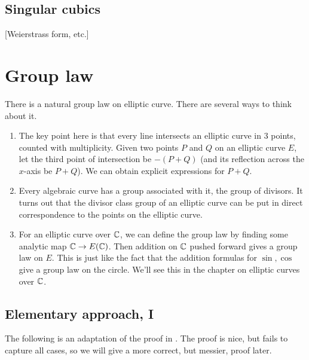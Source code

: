 \subsection{Singular cubics}
[Weierstrass form, etc.]



\section{Group law}
There is a natural group law on elliptic curve. There are several ways to think about it.
\begin{enumerate}
\item
The key point here is that every line intersects an elliptic curve in 3 points, counted with multiplicity.
Given two points $P$ and $Q$ on an elliptic curve $E$, let the third point of intersection be $-(P+Q)$ (and its reflection across the $x$-axis be $P+Q$). We can obtain explicit expressions for $P+Q$.
\item 
Every algebraic curve has a group associated with it, the group of divisors. It turns out that the divisor class group of an elliptic curve can be put in direct correspondence to the points on the elliptic curve.
\item
For an elliptic curve over $\mathbb{C}$, we can define the group law by finding some analytic map $\mathbb{C}\to E(\mathbb{C})$. Then addition on $\mathbb{C}$ pushed forward gives a group law on $E$. This is just like the fact that the addition formulas for $\sin,\cos$ give a group law on the circle. We'll see this in the chapter on elliptic curves over $\mathbb{C}$.
\end{enumerate}

\subsection{Elementary approach, I}

The following is an adaptation of the proof in \cite[p.\ 28]{Cassels}. The proof is nice, but fails to capture all cases, so we will give a more correct, but messier, proof later.


